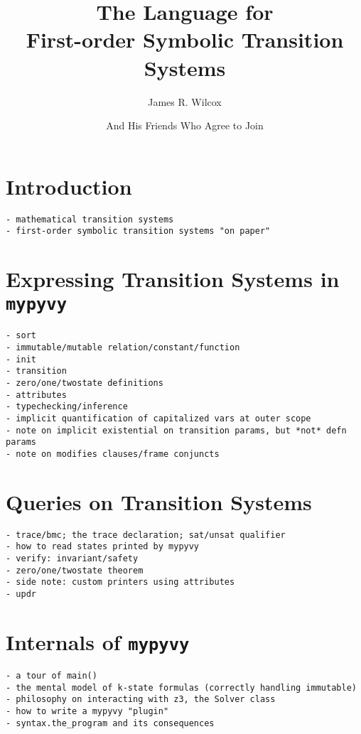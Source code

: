 \documentclass[10pt]{article}
\title{The \mypyvy{} Language for\\First-order Symbolic Transition Systems}
\author{James R. Wilcox \and And His Friends Who Agree to Join}
\date{}
\newcommand{\mypyvy}{\texttt{mypyvy}}
\begin{document}
\maketitle

\section*{Introduction}

\begin{verbatim}
- mathematical transition systems
- first-order symbolic transition systems "on paper"
\end{verbatim}

\section*{Expressing Transition Systems in \mypyvy}

\begin{verbatim}
- sort
- immutable/mutable relation/constant/function
- init
- transition
- zero/one/twostate definitions
- attributes
- typechecking/inference
- implicit quantification of capitalized vars at outer scope
- note on implicit existential on transition params, but *not* defn params
- note on modifies clauses/frame conjuncts
\end{verbatim}

\section*{Queries on Transition Systems}

\begin{verbatim}
- trace/bmc; the trace declaration; sat/unsat qualifier
- how to read states printed by mypyvy
- verify: invariant/safety
- zero/one/twostate theorem
- side note: custom printers using attributes
- updr
\end{verbatim}

\section*{Internals of \mypyvy}

\begin{verbatim}
- a tour of main()
- the mental model of k-state formulas (correctly handling immutable)
- philosophy on interacting with z3, the Solver class
- how to write a mypyvy "plugin"
- syntax.the_program and its consequences
\end{verbatim}
\end{document}
